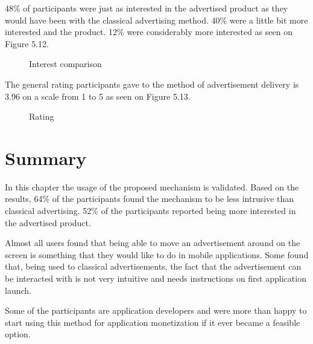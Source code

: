 48\% of participants were just as interested in the advertised product as they would have been with the classical advertising method. 40\% were a little bit more interested and the product. 12\% were considerably more interested as seen on Figure 5.12.

\begin{figure}
\begin{center}
\caption{Interest comparison}
\end{center}
\end{figure}

The general rating participants gave to the method of advertisement delivery is 3.96 on a scale from 1 to 5 as seen on Figure 5.13.

\begin{figure}
\begin{center}
\caption{Rating}
\end{center}
\end{figure}

\section{Summary}

In this chapter the usage of the proposed mechanism is validated. Based on the results, 64\% of the participants found the mechanism to be less intrusive than classical advertising. 52\% of the participants reported being more interested in the advertised product.

Almost all users found that being able to move an advertisement around on the screen is something that they would like to do in mobile applications. Some found that, being used to classical advertisements, the fact that the advertisement can be interacted with is not very intuitive and needs instructions on first application launch.

Some of the participants are application developers and were more than happy to start using this method for application monetization if it ever became a feasible option.